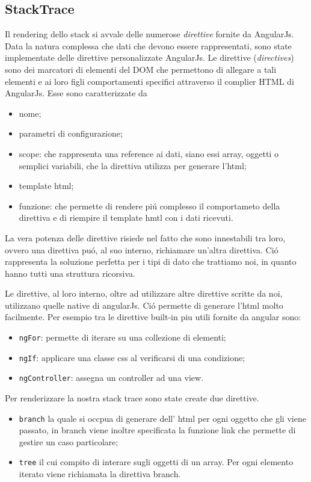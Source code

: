 \subsection{StackTrace} 
Il rendering dello stack si avvale delle numerose \emph{direttive} fornite da 
AngularJs. \\Data la natura complessa che dati che devono essere rappresentati, sono state 
implementate delle direttive personalizzate AngularJs. 
Le direttive (\emph{directives}) sono dei marcatori di elementi del DOM che permettono di allegare 
a tali elementi e ai loro figli comportamenti specifici attraverso il complier 
HTML di AngularJs. Esse sono  caratterizzate da 
\begin{itemize} 
	\item nome;
	\item parametri di configurazione;
	\item scope:  che rappresenta una reference ai dati, siano essi array, oggetti o 
	semplici variabili, che la direttiva utilizza per generare l'html;
	\item template html;
	\item funzione: che permette di rendere piú complesso il comportameto della direttiva
	e di riempire il template hmtl con i dati ricevuti.
\end{itemize} 

La vera potenza delle direttive risiede nel fatto che sono innestabili tra loro, 
ovvero una direttiva puó, al suo interno, richiamare un'altra direttiva. Ció 
rappresenta la soluzione perfetta per i tipi di dato che trattiamo noi, in quanto 
hanno tutti una struttura ricorsiva. 

Le direttive, al loro interno, oltre ad utilizzare altre direttive scritte da noi, 
utilizzano quelle native di angularJs. Ció permette di generare l'html molto 
facilmente. Per esempio tra le direttive built-in piu utili fornite da angular sono: 
\begin{itemize} 
	\item \texttt{ngFor}: permette di iterare su una collezione di elementi;
	\item \texttt{ngIf}: applicare una classe css al verificarsi di una condizione; 
	\item \texttt{ngController}: assegna un controller ad una view.
\end{itemize} 

Per renderizzare la nostra stack trace sono state create due direttive. 
\begin{itemize} 
	\item \texttt{branch} la quale si occpua di generare dell' html per ogni oggetto che gli viene passato, 
	in branch viene inoltre specificata la funzione link che permette di gestire un caso particolare;
	\item \texttt{tree} il cui compito di interare sugli oggetti di un array. Per ogni elemento iterato viene richiamata 
	la direttiva branch. 
\end{itemize} 

